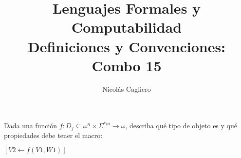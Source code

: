 \documentclass{article}
\title{Lenguajes Formales y Computabilidad \\
        \large Definiciones y Convenciones: Combo 15 }
\author{Nicolás Cagliero}
\begin{document}
\maketitle

Dada una función $f : D_f \subseteq \omega^n \times \Sigma^{*m} \rightarrow \omega$,
describa qué tipo de objeto es y qué propiedades debe tener el macro:
\begin{center}
    $[V2 \leftarrow f(V1, W1)]$
\end{center}
\end{document}
